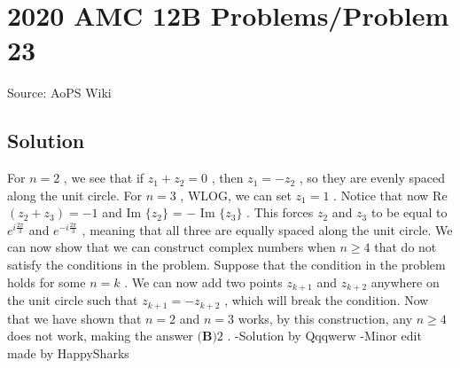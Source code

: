 \documentclass[12pt]{article}
\begin{document}
\section*{{2020 AMC 12B Problems/Problem 23}}
Source: AoPS Wiki

\subsection*{Solution}
For $n=2$ , we see that if $z_{1}+z_{2}=0$ , then $z_{1}=-z_{2}$ , so they are evenly spaced along the unit circle. For $n=3$ , WLOG, we can set $z_{1}=1$ . Notice that now Re $(z_{2}+z_{3})=-1$ and Im $\{z_{2}\}$ = $-$ Im $\{z_{3}\}$ . This forces $z_{2}$ and $z_{3}$ to be equal to $e^{i\frac{2\pi}{3}}$ and $e^{-i\frac{2\pi}{3}}$ , meaning that all three are equally spaced along the unit circle. We can now show that we can construct complex numbers when $n\geq 4$ that do not satisfy the conditions in the problem. Suppose that the condition in the problem holds for some $n=k$ . We can now add two points $z_{k+1}$ and $z_{k+2}$ anywhere on the unit circle such that $z_{k+1}=-z_{k+2}$ , which will break the condition. Now that we have shown that $n=2$ and $n=3$ works, by this construction, any $n\geq 4$ does not work, making the answer $\boxed{\textbf{(B)} 2}$ . -Solution by Qqqwerw
-Minor edit made by HappySharks
\end{document}
